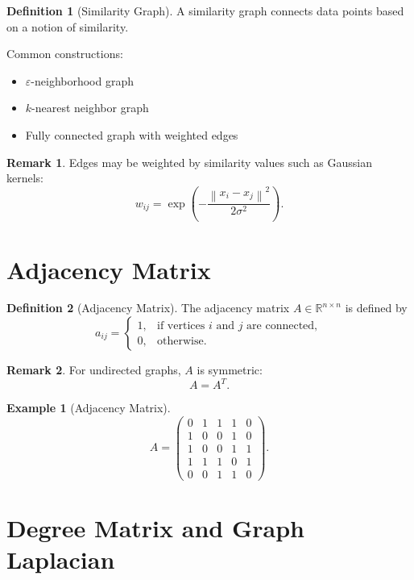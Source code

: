 \documentclass[12pt,oneside]{book}
\numberwithin{equation}{section}
\theoremstyle{definition}
\newtheorem{definition}{Definition}[section]
\newtheorem{example}{Example}[section]
\newtheorem{remark}{Remark}[section]
\theoremstyle{plain}
\theoremstyle{remark}
\newcommand{\R}{\mathbb{R}}
\newcommand{\norm}[1]{\left\lVert #1 \right\rVert}
\begin{document}
\begin{definition}[Similarity Graph]
A similarity graph connects data points based on a notion of similarity.
\end{definition}

Common constructions:
\begin{itemize}
    \item $\varepsilon$-neighborhood graph
    \item $k$-nearest neighbor graph
    \item Fully connected graph with weighted edges
\end{itemize}

\begin{remark}
Edges may be weighted by similarity values such as Gaussian kernels:
\[
w_{ij} = \exp\left(-\frac{\norm{x_i - x_j}^2}{2\sigma^2}\right).
\]
\end{remark}

\section{Adjacency Matrix}

\begin{definition}[Adjacency Matrix]
The adjacency matrix $A \in \R^{n\times n}$ is defined by
\[
a_{ij}
=
\begin{cases}
1, & \text{if vertices $i$ and $j$ are connected},\\
0, & \text{otherwise}.
\end{cases}
\]
\end{definition}

\begin{remark}
For undirected graphs, $A$ is symmetric:
\[
A = A^T.
\]
\end{remark}

\begin{example}[Adjacency Matrix]
\[
A =
\begin{pmatrix}
0 & 1 & 1 & 1 & 0\\
1 & 0 & 0 & 1 & 0\\
1 & 0 & 0 & 1 & 1\\
1 & 1 & 1 & 0 & 1\\
0 & 0 & 1 & 1 & 0
\end{pmatrix}.
\]
\end{example}

\section{Degree Matrix and Graph Laplacian}
\end{document}
